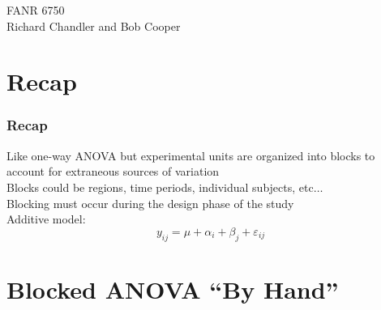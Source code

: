 \documentclass[color=usenames,dvipsnames]{beamer}\usepackage[]{graphicx}\usepackage[]{color}
\begin{document}




\begin{frame}[plain]
  \LARGE
  \centering \par
  {\color{RoyalBlue}{Lab 6 -- Randomized Complete Block Design \par}}
  \vspace{1cm}
  \large
  FANR 6750 \\
  \vfill
  \large
  Richard Chandler and Bob Cooper
\end{frame}


\section{Recap}

\begin{frame}
  \frametitle{Recap}
  \large
  Like one-way ANOVA but experimental units are
  organized into blocks to account for extraneous sources of
  variation \\
      \pause
      \vfill
      Blocks could be regions, time periods, individual subjects,
      etc$\ldots$ \\
      \pause
      \vfill
      Blocking must occur during the design phase of the study \\
      \pause
      \vfill
      Additive model:
  \[
    y_{ij} = \mu + \alpha_i + \beta_j + \varepsilon_{ij}
  \]
\end{frame}


\section{Blocked ANOVA ``By Hand''}
\end{document}
